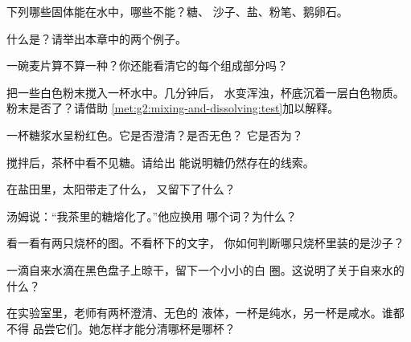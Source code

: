 \begin{exercise}[$\star$]\label{exo:g2:mixing-and-dissolving:1}
下列哪些固体能在水中，哪些不能？糖、
沙子、盐、粉笔、鹅卵石。
\end{exercise}

\begin{exercise}[$\star$]\label{exo:g2:mixing-and-dissolving:2}
什么是？请举出本章中的两个例子。
\end{exercise}

\begin{exercise}[$\star$]\label{exo:g2:mixing-and-dissolving:3}
一碗麦片算不算一种？你还能看清它的每个组成部分吗？
\end{exercise}

\begin{exercise}[$\star$]\label{exo:g2:mixing-and-dissolving:4}
把一些白色粉末搅入一杯水中。几分钟后，
水变浑浊，杯底沉着一层白色物质。
粉末是否了？请借助
\cref{met:g2:mixing-and-dissolving:test}加以解释。
\end{exercise}

\begin{exercise}[$\star$]\label{exo:g2:mixing-and-dissolving:5}
一杯糖浆水呈粉红色。它是否澄清？是否无色？
它是否为？
\end{exercise}

\begin{exercise}[$\star$]\label{exo:g2:mixing-and-dissolving:6}
搅拌后，茶杯中看不见糖。请给出
能说明糖仍然存在的线索。
\end{exercise}

\begin{exercise}[$\star$]\label{exo:g2:mixing-and-dissolving:7}
在盐田里，太阳带走了什么，
又留下了什么？
\end{exercise}

\begin{exercise}[$\star$]\label{exo:g2:mixing-and-dissolving:8}
汤姆说：“我茶里的糖熔化了。”他应换用
哪个词？为什么？
\end{exercise}

\begin{exercise}[$\star\star$]\label{exo:g2:mixing-and-dissolving:9}
看一看有两只烧杯的图。不看杯下的文字，
你如何判断哪只烧杯里装的是沙子？
\end{exercise}

\begin{exercise}[$\star\star$]\label{exo:g2:mixing-and-dissolving:10}
一滴自来水滴在黑色盘子上晾干，留下一个小小的白
圈。这说明了关于自来水的什么？
\end{exercise}

\begin{exercise}[$\star\star$]\label{exo:g2:mixing-and-dissolving:11}
在实验室里，老师有两杯澄清、无色的
液体，一杯是纯水，另一杯是咸水。谁都不得
品尝它们。她怎样才能分清哪杯是哪杯？
\end{exercise}
